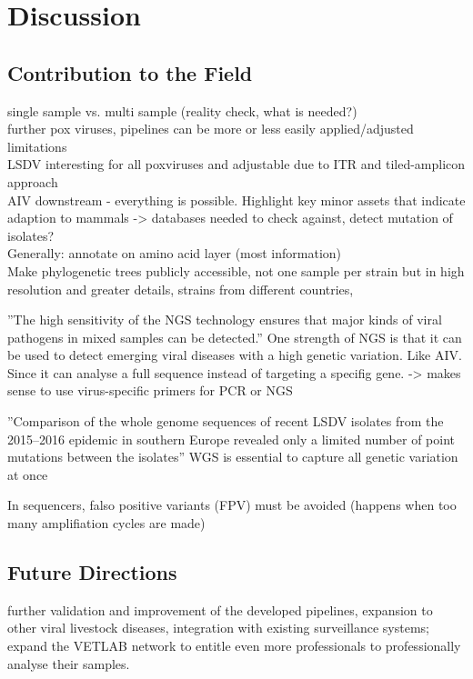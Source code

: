 \chapter{Discussion}\label{chap:discussion}

\section{Contribution to the Field}
single sample vs. multi sample (reality check, what is needed?) \\
further pox viruses, pipelines can be more or less easily applied/adjusted \\
limitations \\
LSDV interesting for all poxviruses and adjustable due to ITR and tiled-amplicon approach \\
AIV downstream - everything is possible. Highlight key minor assets that indicate adaption to mammals -> databases needed to check against, detect mutation of isolates? \\
Generally: annotate on amino acid layer (most information) \\

Make phylogenetic trees publicly accessible, not one sample per strain but in high resolution and greater details, strains from different countries,

''The high sensitivity of the NGS technology ensures that major kinds of viral pathogens in mixed samples can be detected.''
One strength of NGS is that it can be used to detect emerging viral diseases with a high genetic variation. Like AIV. Since it can analyse a full sequence instead of targeting a specifig gene. -> makes sense to use virus-specific primers for PCR or NGS 

''Comparison of the whole genome sequences of recent LSDV isolates from the 2015–2016 epidemic in southern Europe revealed only a limited number of point mutations between the isolates'' WGS is essential to capture all genetic variation at once

In sequencers, falso positive variants (FPV) must be avoided (happens when too many amplifiation cycles are made)

\section{Future Directions}
further validation and improvement of the developed pipelines, expansion to other viral livestock diseases, integration with existing surveillance systems; expand the VETLAB network to entitle even more professionals to professionally analyse their samples.

